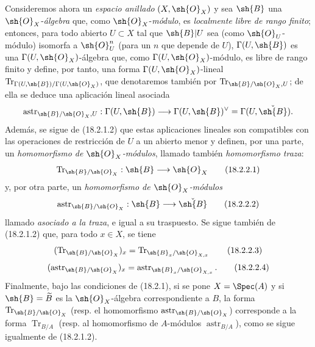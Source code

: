 \begin{env}[18.2.2]
\label{IV.18.2.2}
Consideremos ahora un \emph{espacio anillado} $(X,\sh{O}_X)$ y sea $\sh{B}$ una $\sh{O}_X$-\emph{álgebra} que, como $\sh{O}_X$-\emph{módulo}, es \emph{localmente libre de rango finito}; entonces, para todo abierto $U\subset X$ tal que $\sh{B}|U$ sea (como $\sh{O}_U$-módulo) isomorfa a $\sh{O}_U^n$ (para un $n$ que depende de $U$), $\Gamma(U,\sh{B})$ es una $\Gamma(U,\sh{O}_X)$-álgebra que, como $\Gamma(U,\sh{O}_X)$-módulo, es libre de rango finito y define, por tanto, una forma $\Gamma(U,\sh{O}_X)$-lineal $\operatorname{Tr}_{\Gamma(U,\sh{B})/\Gamma(U,\sh{O}_X)}$, que denotaremos también por $\operatorname{Tr}_{\sh{B}/\sh{O}_X,U}$; de ella se deduce una aplicación lineal asociada
\[
  \operatorname{astr}_{\sh{B}/\sh{O}_X,U}:\Gamma(U,\sh{B})\longrightarrow\Gamma(U,\sh{B})^\vee=\Gamma(U,\check{\sh{B}}).
\]
Además, se sigue de (18.2.1.2) que estas aplicaciones lineales son compatibles con las operaciones de restricción de $U$ a un abierto menor y definen, por una parte, un \emph{homomorfismo de $\sh{O}_X$-módulos}, llamado también \emph{homomorfismo traza}:
\begin{equation}
  \operatorname{Tr}_{\sh{B}/\sh{O}_X}:\sh{B}\longrightarrow\sh{O}_X
  \tag{18.2.2.1}\label{IV.18.2.2.1}
\end{equation}
y, por otra parte, un \emph{homomorfismo de $\sh{O}_X$-módulos}
\begin{equation}
  \operatorname{astr}_{\sh{B}/\sh{O}_X}:\sh{B}\longrightarrow\check{\sh{B}}
  \tag{18.2.2.2}\label{IV.18.2.2.2}
\end{equation}
llamado \emph{asociado a la traza}, e igual a su traspuesto. Se sigue también de (18.2.1.2) que, para todo $x\in X$, se tiene
\begin{equation}
  (\operatorname{Tr}_{\sh{B}/\sh{O}_X})_x=\operatorname{Tr}_{\sh{B}_x/\sh{O}_{X,x}}
  \tag{18.2.2.3}\label{IV.18.2.2.3}
\end{equation}
\begin{equation}
  (\operatorname{astr}_{\sh{B}/\sh{O}_X})_x=\operatorname{astr}_{\sh{B}_x/\sh{O}_{X,x}}.
  \tag{18.2.2.4}\label{IV.18.2.2.4}
\end{equation}
Finalmente, bajo las condiciones de (18.2.1), si se pone $X=\Spec(A)$ y si $\sh{B}=\widetilde B$ es la $\sh{O}_X$-álgebra correspondiente a $B$, la forma $\operatorname{Tr}_{\sh{B}/\sh{O}_X}$ (resp. el homomorfismo $\operatorname{astr}_{\sh{B}/\sh{O}_X}$) corresponde a la forma $\operatorname{Tr}_{B/A}$ (resp. al homomorfismo de $A$-módulos $\operatorname{astr}_{B/A}$), como se sigue igualmente de (18.2.1.2).
\end{env}


